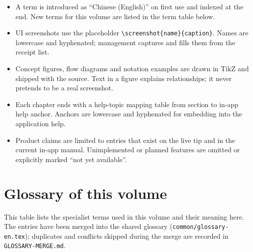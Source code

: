 \begin{itemize}
\item A term is introduced as ``Chinese (English)'' on first use and indexed at the end. New terms for this volume are listed in the term table below.
\item UI screenshots use the placeholder \verb|\screenshot{name}{caption}|. Names are lowercase and hyphenated; management captures and fills them from the receipt list.
\item Concept figures, flow diagrams and notation examples are drawn in TikZ and shipped with the source. Text in a figure explains relationships; it never pretends to be a real screenshot.
\item Each chapter ends with a help-topic mapping table from section to in-app help anchor. Anchors are lowercase and hyphenated for embedding into the application help.
\item Product claims are limited to entries that exist on the live tip and in the current in-app manual. Unimplemented or planned features are omitted or explicitly marked ``not yet available''.
\end{itemize}

\section*{Glossary of this volume}

This table lists the specialist terms used in this volume and their meaning here. The entries have been merged into the shared glossary (\texttt{common/glossary-en.tex}); duplicates and conflicts skipped during the merge are recorded in \texttt{GLOSSARY-MERGE.md}.

